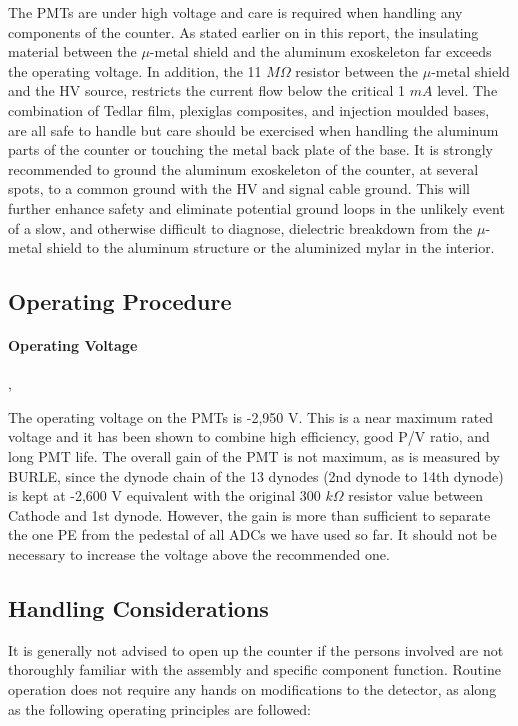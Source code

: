 The PMTs are under high voltage and care is required when handling any 
components of the counter. As stated earlier on in this report, the insulating 
material between the $\mu$-metal shield and the aluminum exoskeleton far 
exceeds the operating voltage. In addition, the 11 $M\Omega$ resistor between 
the $\mu$-metal shield and the HV source, restricts the current flow below the  
critical 1 $mA$ level. The combination of Tedlar film, plexiglas composites, 
and injection moulded bases, are all safe to handle but care should be 
exercised when handling the aluminum parts of the counter or touching the metal 
back plate of the base. It is strongly recommended to ground the aluminum 
exoskeleton of the counter, at several spots, to a common ground with the HV 
and signal cable ground. This will further enhance safety and eliminate 
potential ground loops in the unlikely event of a slow, and otherwise difficult 
to diagnose, dielectric breakdown from the $\mu$-metal shield to the aluminum 
structure or the aluminized mylar in the interior.  


\subsection{Operating Procedure}

\paragraph{Operating Voltage}
,

The operating voltage on the PMTs is -2,950 V. This is a near maximum rated 
voltage and it has been shown to combine high efficiency, good P/V ratio,   
and long PMT life. The overall gain of the PMT is not maximum, as is   
measured by BURLE, since the dynode chain of the 13 dynodes (2nd dynode to   
14th dynode) is kept at -2,600 V equivalent with the original 300 $k\Omega$   
resistor value between Cathode and 1st dynode. However, the gain is more   
than sufficient to separate the one PE from the pedestal of all ADCs we have   
used so far. It should not be necessary to increase the voltage above the   
recommended one. 


\subsection{Handling Considerations}


It is generally not advised to open up the counter if the persons involved are
not thoroughly familiar with the assembly and specific component function.
Routine operation does not require any hands on modifications to the detector,
as along as the following operating principles are followed: 

